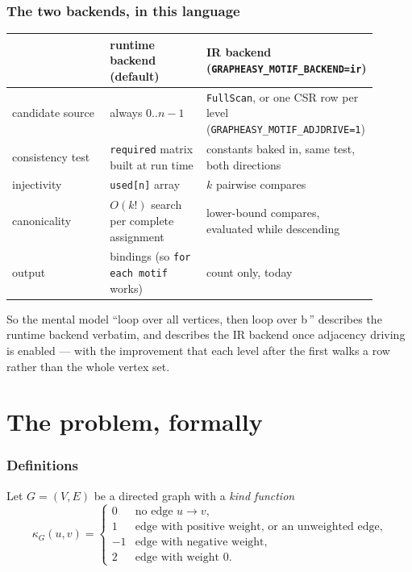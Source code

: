 \documentclass[11pt,a4paper]{article}
\newcommand{\code}[1]{\texttt{#1}}
\begin{document}
\section{The two backends, in this language}

\begin{center}
\begin{tabular}{@{}p{0.30\linewidth}p{0.30\linewidth}p{0.30\linewidth}@{}}
\toprule
& runtime backend (default) & IR backend (\code{GRAPHEASY\_MOTIF\_BACKEND=ir}) \\
\midrule
candidate source & always $0..n-1$ & \code{FullScan}, or one CSR row per level
(\code{GRAPHEASY\_MOTIF\_ADJDRIVE=1}) \\
consistency test & \code{required} matrix built at run time & constants baked in,
same test, both directions \\
injectivity & \code{used[n]} array & $k$ pairwise compares \\
canonicality & $O(k!)$ search per complete assignment & lower-bound compares,
evaluated while descending \\
output & bindings (so \code{for each motif} works) & count only, today \\
\bottomrule
\end{tabular}
\end{center}

So the mental model ``loop over all vertices, then loop over b\,'' describes the
runtime backend verbatim, and describes the IR backend once adjacency driving is
enabled --- with the improvement that each level after the first walks a row
rather than the whole vertex set.

\part{The problem, formally}

\section{Definitions}

Let $G=(V,E)$ be a directed graph with a \emph{kind function}
\[
  \kappa_G(u,v)=
  \begin{cases}
    0 & \text{no edge } u\to v,\\
    1 & \text{edge with positive weight, or an unweighted edge},\\
    -1 & \text{edge with negative weight},\\
    2 & \text{edge with weight } 0.
  \end{cases}
\]
\end{document}
